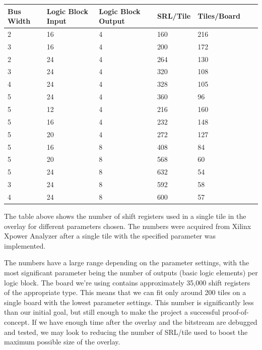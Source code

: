 \documentclass[12pt,letterpaper]{article}
\begin{document}
\begin{appendices}
\begin{tabular}{|l|l|l|l|l|l|l|}
\hline
\textbf{Bus Width} & \textbf{Logic Block Input} & \textbf{Logic Block Output} & \textbf{SRL/Tile} & \textbf{Tiles/Board} \\ \hline
\hline
2 & 16 & 4 & 160 & 216 \\ \hline
3 & 16 & 4 & 200 & 172 \\ \hline
2 & 24 & 4 & 264 & 130\\ \hline
3 & 24 & 4 & 320 & 108\\ \hline
4 & 24 & 4 & 328 & 105\\ \hline
5 & 24 & 4 & 360 & 96\\ \hline
5 & 12 & 4 & 216 & 160\\ \hline
5 & 16 & 4 & 232 & 148\\ \hline
5 & 20 & 4 & 272 & 127\\ \hline
5 & 16 & 8 & 408 & 84\\ \hline
5 & 20 & 8 & 568 & 60\\ \hline
5 & 24 & 8 & 632 & 54\\ \hline
3 & 24 & 8 & 592 & 58\\ \hline
4 & 24 & 8 & 600 & 57\\ \hline
\end{tabular}

The table above shows the number of shift registers used in a single tile in the overlay for different parameters chosen. The numbers were acquired from Xilinx Xpower Analyzer after a single tile with the specified parameter was implemented.

The numbers have a large range depending on the parameter settings, with the most significant parameter being the number of outputs (basic logic elements) per logic block. The board we're using contains approximately 35,000 shift registers of the appropriate type. This means that we can fit only around 200 tiles on a single board with the lowest parameter settings. This number is significantly less than our initial goal, but still enough to make the project a successful proof-of-concept. If we have enough time after the overlay and the bitstream are debugged and tested, we may look to reducing the number of SRL/tile used to boost the maximum possible size of the overlay.


\end{appendices}
\end{document}
